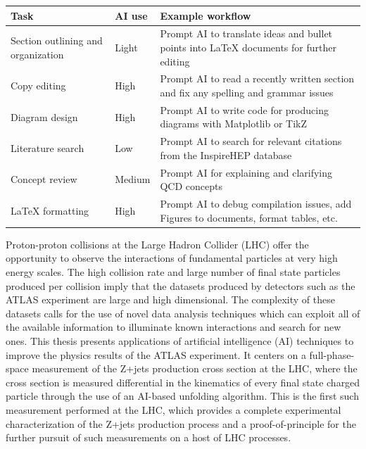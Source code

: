 {  \vspace{0.5em}
  \begin{singlespace}
  \noindent\begin{tabularx}{\textwidth}{@{}
      >{\raggedright\arraybackslash}p{}
      >{\centering\arraybackslash}p{}
      X@{}}
    \toprule
    \textbf{Task} & \textbf{AI use} & \textbf{Example workflow} \\
    \midrule
    Section outlining and organization
      & Light
      & Prompt AI to translate ideas and bullet points into \LaTeX{} documents for further editing \\
    \addlinespace
    Copy editing
      & High
      & Prompt AI to read a recently written section and fix any spelling and grammar issues \\
    \addlinespace
    Diagram design
      & High
      & Prompt AI to write code for producing diagrams with Matplotlib or TikZ \\
    \addlinespace
    Literature search
      & Low
      & Prompt AI to search for relevant citations from the InspireHEP database \\
    \addlinespace
    Concept review
      & Medium
      & Prompt AI for explaining and clarifying QCD concepts \\
    \addlinespace
    \LaTeX{} formatting
      & High
      & Prompt AI to debug compilation issues, add Figures to documents, format tables, etc. \\
    \bottomrule
  \end{tabularx}
  \end{singlespace}
  \clearpage
}

\thesisabstract
{
  Proton-proton collisions at the Large Hadron Collider (LHC) offer the opportunity to observe the interactions of fundamental particles at very high energy scales. The high collision rate and large number of final state particles produced per collision imply that the datasets produced by detectors such as the ATLAS experiment are large and high dimensional. The complexity of these datasets calls for the use of novel data analysis techniques which can exploit all of the available information to illuminate known interactions and search for new ones. This thesis presents applications of artificial intelligence (AI) techniques to improve the physics results of the ATLAS experiment. It centers on a full-phase-space measurement of the Z+jets production cross section at the LHC, where the cross section is measured differential in the kinematics of every final state charged particle through the use of an AI-based unfolding algorithm. This is the first such measurement performed at the LHC, which provides a complete experimental characterization of the Z+jets production process and a proof-of-principle for the further pursuit of such measurements on a host of LHC processes.
}



